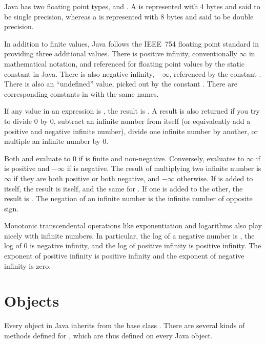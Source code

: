 Java has two floating point types,  and .  A
 is represented with 4 bytes and said to be single
precision, whereas a  is represented with 8 bytes and
said to be double precision.

In addition to finite values, Java follows the IEEE~754 floating point
standard in providing three additional values.  There is positive
infinity, conventionally $\infty$ in mathematical notation, and
referenced for floating point values by the static constant
 in Java.  There is also negative
infinity, $-\infty$, referenced by the constant
.  There is also an ``undefined''
value, picked out by the constant .  There are
corresponding constants in  with the same names.

If any value in an expression is , the result is .
A  result is also returned if you try to divide 0 by 0,
subtract an infinite number from itself (or equivalently add a positive
and negative infinite number), divide one infinite number
by another, or multiple an infinite number by 0.

Both  and
 evaluate to 0 if  is finite
and non-negative.  Conversely,  evaluates to $\infty$ if
 is positive and $-\infty$ if  is negative.
The result of multiplying two infinite number is $\infty$ if they are
both positive or both negative, and $-\infty$ otherwise.  If
 is added to itself, the result is
itself, and the same for .  If one is
added to the other, the result is .  The negation of an
infinite number is the infinite number of opposite sign.  

Monotonic transcendental operations like exponentiation and logarithms
also play nicely with infinite numbers.  In particular, the log of a
negative number is , the log of 0 is negative infinity, and
the log of positive infinity is positive infinity.  The exponent of
positive infinity is positive infinity and the exponent of negative
infinity is zero.



\section{Objects}

Every object in Java inherits from the base class .
There are several kinds of methods defined for , which
are thus defined on every Java object.

